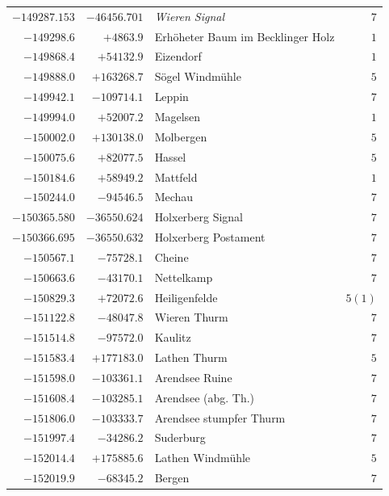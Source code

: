 \begin{center}
\begin{tabular}{r|r|p{170pt}|r}
\(-149287.153\)&\(-46456.701\)&\textit{Wieren Signal}&\(7\)\\
\(-149298.6\)&\(+4863.9\)&Erhöheter Baum im Becklinger Holz&\(1\)\\
\(-149868.4\)&\(+54132.9\)&Eizendorf&\(1\)\\
\(-149888.0\)&\(+163268.7\)&Sögel Windmühle&\(5\)\\
\(-149942.1\)&\(-109714.1\)&Leppin&\(7\)\\
\(-149994.0\)&\(+52007.2\)&Magelsen&\(1\)\\
\(-150002.0\)&\(+130138.0\)&Molbergen&\(5\)\\
\(-150075.6\)&\(+82077.5\)&Hassel&\(5\)\\
\(-150184.6\)&\(+58949.2\)&Mattfeld&\(1\)\\
\(-150244.0\)&\(-94546.5\)&Mechau&\(7\)\\
\(-150365.580\)&\(-36550.624\)&Holxerberg Signal&\(7\)\\
\(-150366.695\)&\(-36550.632\)&Holxerberg Postament&\(7\)\\
\(-150567.1\)&\(-75728.1\)&Cheine&\(7\)\\
\(-150663.6\)&\(-43170.1\)&Nettelkamp&\(7\)\\
\(-150829.3\)&\(+72072.6\)&Heiligenfelde&\(5 (1)\)\\
\(-151122.8\)&\(-48047.8\)&Wieren Thurm&\(7\)\\
\(-151514.8\)&\(-97572.0\)&Kaulitz&\(7\)\\
\(-151583.4\)&\(+177183.0\)&Lathen Thurm&\(5\)\\
\(-151598.0\)&\(-103361.1\)&Arendsee Ruine&\(7\)\\
\(-151608.4\)&\(-103285.1\)&Arendsee (abg. Th.)&\(7\)\\
\(-151806.0\)&\(-103333.7\)&Arendsee stumpfer Thurm&\(7\)\\
\(-151997.4\)&\(-34286.2\)&Suderburg&\(7\)\\
\(-152014.4\)&\(+175885.6\)&Lathen Windmühle&\(5\)\\
\(-152019.9\)&\(-68345.2\)&Bergen&\(7\)\\
\hline\end{tabular}\endgroup\end{center}
\clearpage
